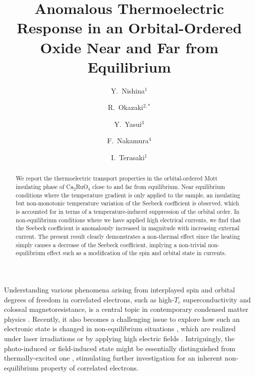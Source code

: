 \documentclass[aps,twocolumn,showpacs,preprintnumbers,amsmath,amssymb,floats,citeautoscript,nobalancelastpage]{revtex4-1}
\begin{document}
\title{Anomalous Thermoelectric Response in an Orbital-Ordered Oxide Near and Far from Equilibrium}

\author{Y.~Nishina$^{1}$}
\author{R.~Okazaki$^{2,\ast}$}
\author{Y.~Yasui$^{3}$}
\author{F.~Nakamura$^{4}$}
\author{I.~Terasaki$^{1}$}



\begin{abstract}
We report the thermoelectric transport properties in the orbital-ordered Mott insulating phase of Ca$_2$RuO$_4$
close to and far from equilibrium.
Near equilibrium conditions where the temperature gradient is only applied to the sample, 
an insulating but non-monotonic temperature variation of the Seebeck coefficient is observed, 
which is accounted for in terms of a temperature-induced suppression of the orbital order.
In non-equilibrium conditions where we have applied high electrical currents,
we find 
that the Seebeck coefficient is anomalously increased in magnitude with 
increasing external current.
The present result clearly demonstrates a non-thermal effect
since the heating simply causes a decrease of the Seebeck coefficient,
implying a non-trivial non-equilibrium effect
such as a modification of the spin and orbital state in currents.
\end{abstract}


\maketitle

Understanding various phenomena arising from
interplayed spin and orbital degrees of freedom in correlated electrons,
such as high-$T_c$ superconductivity and colossal magnetoresistance, 
is a central topic in contemporary condensed matter physics \cite{Dagotto05}.
Recently, it also becomes a challenging issue 
to explore
how such an electronic state is changed in non-equilibrium situations \cite{Yonemitsu2008,Aoki2014},
which are realized under laser irradiations \cite{Koshihara2006}
or by applying high electric fields \cite{Asamitsu1997}.
Intriguingly, the photo-induced or field-induced state
might be essentially distinguished from thermally-excited one \cite{Potember1979,Tayagaki2001,Sawano2005,Kim2008},
stimulating further investigation for an inherent non-equilibrium property of correlated electrons.
\end{document}
